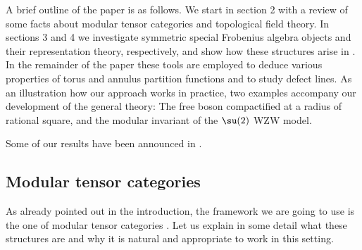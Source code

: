 \medskip

A brief outline of the paper is as follows. We start in section 2 with 
a review of some facts about modular tensor categories and topological
field theory. In sections 3 and 4 we investigate symmetric special 
Frobenius algebra objects and their representation theory, respectively,
and show how these structures arise in \cft. In the remainder of the paper 
these tools are employed to deduce various properties of torus and annulus 
partition functions and to study defect lines. As an illustration how 
our approach works in practice, two examples accompany our development 
of the general theory: The free boson compactified at a radius of 
rational square, and the \E modular invariant of the $\su(2)$ WZW model.

Some of our results have been announced in \cite{fuRs,fuRs2}.

\newpage 
{\small \tableofcontents} 
\newpage

\label{sec:mod-cat-cCFT} 


\subsection{Modular tensor categories} \label{sec:mod-cat}

As already pointed out in the introduction, the framework we are going 
to use is the one of modular tensor categories \cite{TUra,KAss,KArt,BAki}. 
Let us explain in some detail what these structures are and why it is 
natural and appropriate to work in this setting.

